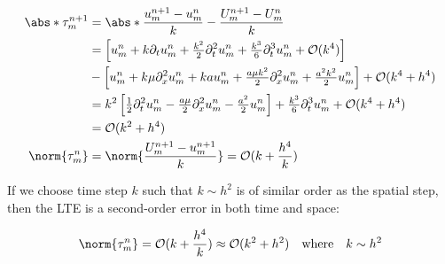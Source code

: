 \begin{align*}
  \abs*{\tau_m^{n+1}} & = \abs*{\dfrac{u_m^{n+1} - u_m^n}{k} - \dfrac{U_m^{n+1} - U_m^n}{k}}                                                                                                     \\
                      & = \left[ u_m^n + k\partial_t u_m^n + \tfrac{k^2}{2}\partial_t^2 u_m^n + \tfrac{k^3}{6}\partial_t^3 u_m^n + \mathcal{O}(k^4) \right]                                      \\
                      & - \left[ u_m^n + k\mu\partial_{x}^2 u_m^n + kau_m^n + \tfrac{a\mu k^2}{2}\partial_{x}^2 u_m^n + \tfrac{a^2k^2}{2}u_m^n \right] + \mathcal{O}(k^4+h^4)                    \\
                      & = k^2 \left[\tfrac{1}{2}\partial_t^2 u_m^n - \tfrac{a \mu}{2}\partial_{x}^2 u_m^n - \tfrac{a^2}{2}u_m^n\right] + \tfrac{k^3}{6}\partial_t^3 u_m^n + \mathcal{O}(k^4+h^4) \\
                      & = \mathcal{O}(k^2 + h^4)                                                                                                                                                 \\
  \norm{\tau_m^n}     & = \norm{\frac{U_m^{n+1} - u_m^{n+1}}{k}} = \mathcal{O}(k + \frac{h^4}{k})                                                                                                \\
\end{align*}

If we choose time step \(k\) such that \(k \sim h^2\) is of similar order as the spatial step, then the LTE is a second-order error in both time and space:

\[
  \norm{\tau_m^n} = \mathcal{O}(k + \frac{h^4}{k}) \approx \mathcal{O}(k^2 + h^2) \quad \text{where} \quad k \sim h^2
\]

